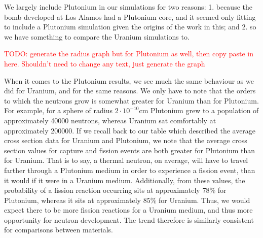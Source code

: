 We largely include Plutonium in our simulations for two reasons: 1. because the bomb developed at Los Alamos had a Plutonium core, and 
it seemed only fitting to include a Plutonium simulation given the origins of the work in this; and 2. so we have something to compare the 
Uranium simulations to. 

\textcolor{red}{TODO: generate the radius graph but for Plutonium as well, then copy paste in here. Shouldn't need to change any text, just 
generate the graph}

When it comes to the Plutonium results, we see much the same behaviour as we did for Uranium, and for the same reasons. We only have 
to note that the orders to which the neutrons grow is somewhat greater for Uranium than for Plutonium. For example, for a sphere 
of radius $2 \cdot 10^{-10}\text{cm}$ Plutonium grew to a population of approximately 40000 neutrons, whereas Uranium sat 
comfortably at approximately 200000. If we recall back to our table which described the average cross section data for 
Uranium and Plutonium, we note that the average cross section values for capture and fission events are both greater for Plutonium 
than for Uranium. That is to say, a thermal neutron, on average, will have to travel farther through a Plutonium medium in order 
to experience a fission event, than it would if it were in a Uranium medium. Additionally, from these values, the probability 
of a fission reaction occurring sits at approximately $78$\% for Plutonium, whereas it sits at approximately $85$\% for Uranium.
Thus, we would expect there to be more fission reactions for a Uranium medium, and thus more opportunity for neutron development. The 
trend therefore is similarly consistent for comparisons between materials.